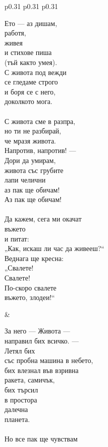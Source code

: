 \documentclass[12pt,a4paper]{article}
\begin{document}
\begin{tabular}{p{0.31\textwidth} p{0.31\textwidth} p{0.31\textwidth}}
\begin{minipage}[t]{\linewidth}
Ето — аз дишам,\\
работя,\\
живея\\
и стихове пиша\\
(тъй както умея).\\
С живота под вежди\\
се гледаме строго\\
и боря се с него,\\
доколкото мога.\\
\\
С живота сме в разпра,\\
но ти не разбирай,\\
че мразя живота.\\
Напротив, напротив! —\\
Дори да умирам,\\
живота със грубите\\
лапи челични\\
аз пак ще обичам!\\
Аз пак ще обичам!\\
\\
Да кажем, сега ми окачат\\
въжето\\
и питат:\\
„Как, искаш ли час да живееш?“\\
Веднага ще кресна:\\
„Свалете!\\
Свалете!\\
По-скоро свалете\\
въжето, злодеи!“\\
\end{minipage}
&
\begin{minipage}[t]{\linewidth}
За него — Живота —\\
направил бих всичко. —\\
Летял бих\\
със пробна машина в небето,\\
бих влезнал във взривна\\
ракета, самичък,\\
бих търсил\\
в простора\\
далечна\\
планета.\\
\\
Но все пак ще чувствам\\

\end{minipage}
\end{tabular}
\end{document}
